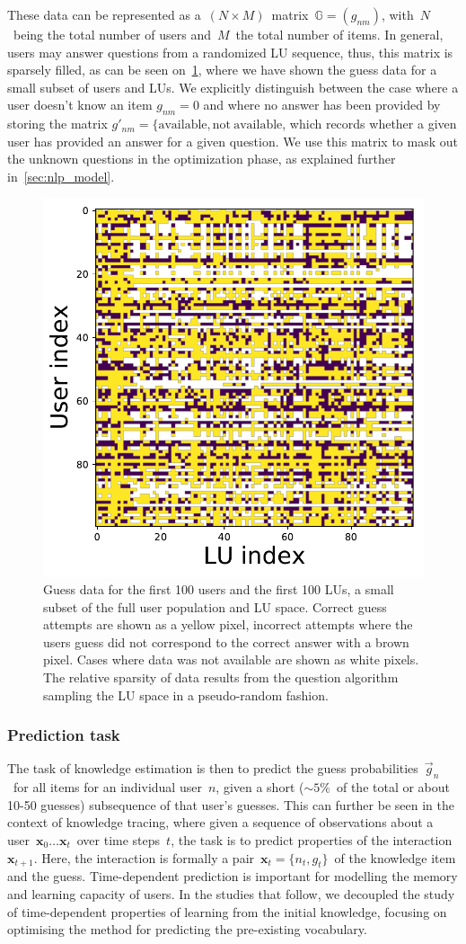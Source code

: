 These data can be represented as a~$(N \times M)$~matrix~$\mathbb{G} = (g_{nm})$, with~$N$~being the total number of users and~$M$~the total number of items. In general, users may answer questions from a randomized LU sequence, thus, this matrix is sparsely filled, as can be seen on~\cref{fig:user_data}, where we have shown the guess data for a small subset of users and LUs. We explicitly distinguish between the case where a user doesn't know an item $g_{nm} = 0$ and where no answer has been provided by storing the matrix $g'_{nm} = \{\mathrm{available}, \mathrm{not~available}$, which records whether a given user has provided an answer for a given question. We use this matrix to mask out the unknown questions in the optimization phase, as explained further in~\cref{sec:nlp_model}.

\begin{figure}[ht]
\centering
\includegraphics[width=0.5\linewidth]{figures/lingvist/user_data.pdf}
\caption[Word pair (LU) guess data for a subset of users and words]{Guess data for the first 100 users and the first 100 LUs, a small subset of the full user population and LU space. Correct guess attempts are shown as a yellow pixel, incorrect attempts where the users guess did not correspond to the correct answer with a brown pixel. Cases where data was not available are shown as white pixels. The relative sparsity of data results from the question algorithm sampling the LU space in a pseudo-random fashion.} 
\label{fig:user_data} 
\end{figure} 

\subsubsection{Prediction task}
The task of knowledge estimation is then to predict the guess probabilities~$\vec{g}_n$~for all items for an individual user~$n$, given a short ($\sim5\%$~of the total or about 10-50 guesses) subsequence of that user's guesses. This can further be seen in the context of knowledge tracing, where given a sequence of observations about a user~$\mathbf{x}_0 \dots \mathbf{x}_t$~over time steps~$t$, the task is to predict properties of the interaction~$\mathbf{x}_{t+1}$. Here, the interaction is formally a pair~$\mathbf{x}_t = \{n_t, g_t\}$~of the knowledge item and the guess. Time-dependent prediction is important for modelling the memory and learning capacity of users. In the studies that follow, we decoupled the study of time-dependent properties of learning from the initial knowledge, focusing on optimising the method for predicting the pre-existing vocabulary.


